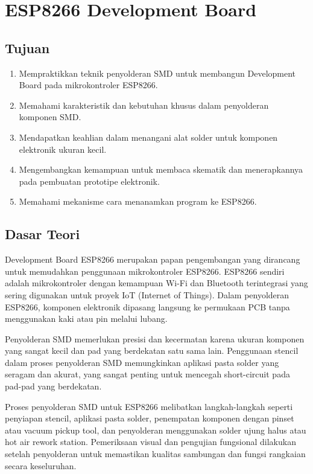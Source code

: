 \chapter{ESP8266 Development Board}

\section{Tujuan}
\begin{enumerate}
    \item Mempraktikkan teknik penyolderan SMD untuk membangun Development Board pada mikrokontroler ESP8266.
    \item Memahami karakteristik dan kebutuhan khusus dalam penyolderan komponen SMD.
    \item Mendapatkan keahlian dalam menangani alat solder untuk komponen elektronik ukuran kecil.
    \item Mengembangkan kemampuan untuk membaca skematik dan menerapkannya pada pembuatan prototipe elektronik.
    \item Memahami mekanisme cara menanamkan program ke ESP8266.
\end{enumerate}

\section{Dasar Teori}
Development Board ESP8266 merupakan papan pengembangan yang dirancang untuk memudahkan penggunaan mikrokontroler ESP8266. ESP8266 sendiri adalah mikrokontroler dengan kemampuan Wi-Fi dan Bluetooth terintegrasi yang sering digunakan untuk proyek IoT (Internet of Things). Dalam penyolderan ESP8266, komponen elektronik dipasang langsung ke permukaan PCB tanpa menggunakan kaki atau pin melalui lubang. 

Penyolderan SMD memerlukan presisi dan kecermatan karena ukuran komponen yang sangat kecil dan pad yang berdekatan satu sama lain. Penggunaan stencil dalam proses penyolderan SMD memungkinkan aplikasi pasta solder yang seragam dan akurat, yang sangat penting untuk mencegah short-circuit pada pad-pad yang berdekatan.

Proses penyolderan SMD untuk ESP8266 melibatkan langkah-langkah seperti penyiapan stencil, aplikasi pasta solder, penempatan komponen dengan pinset atau vacuum pickup tool, dan penyolderan menggunakan solder ujung halus atau hot air rework station. Pemeriksaan visual dan pengujian fungsional dilakukan setelah penyolderan untuk memastikan kualitas sambungan dan fungsi rangkaian secara keseluruhan.


